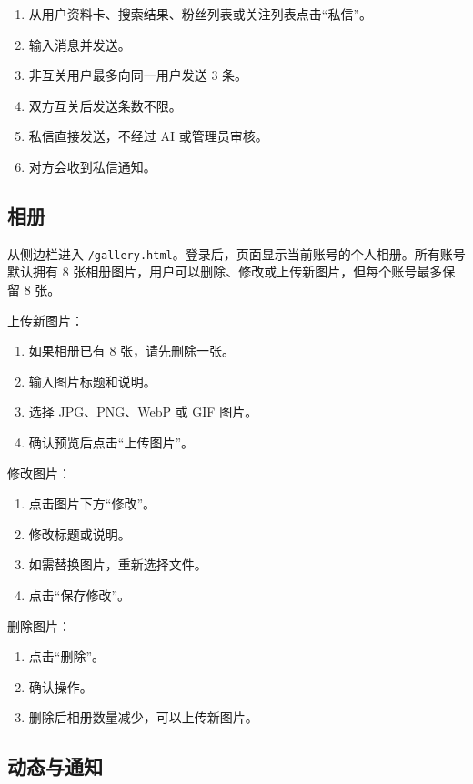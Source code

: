\documentclass[UTF8,a4paper,12pt]{ctexart}
\newcommand{\code}[1]{\texttt{#1}}
\begin{document}
\begin{enumerate}
  \item 从用户资料卡、搜索结果、粉丝列表或关注列表点击“私信”。
  \item 输入消息并发送。
  \item 非互关用户最多向同一用户发送 3 条。
  \item 双方互关后发送条数不限。
  \item 私信直接发送，不经过 AI 或管理员审核。
  \item 对方会收到私信通知。
\end{enumerate}

\subsection{相册}

从侧边栏进入 \code{/gallery.html}。登录后，页面显示当前账号的个人相册。所有账号默认拥有 8 张相册图片，用户可以删除、修改或上传新图片，但每个账号最多保留 8 张。

上传新图片：

\begin{enumerate}
  \item 如果相册已有 8 张，请先删除一张。
  \item 输入图片标题和说明。
  \item 选择 JPG、PNG、WebP 或 GIF 图片。
  \item 确认预览后点击“上传图片”。
\end{enumerate}

修改图片：

\begin{enumerate}
  \item 点击图片下方“修改”。
  \item 修改标题或说明。
  \item 如需替换图片，重新选择文件。
  \item 点击“保存修改”。
\end{enumerate}

删除图片：

\begin{enumerate}
  \item 点击“删除”。
  \item 确认操作。
  \item 删除后相册数量减少，可以上传新图片。
\end{enumerate}

\subsection{动态与通知}
\end{document}
